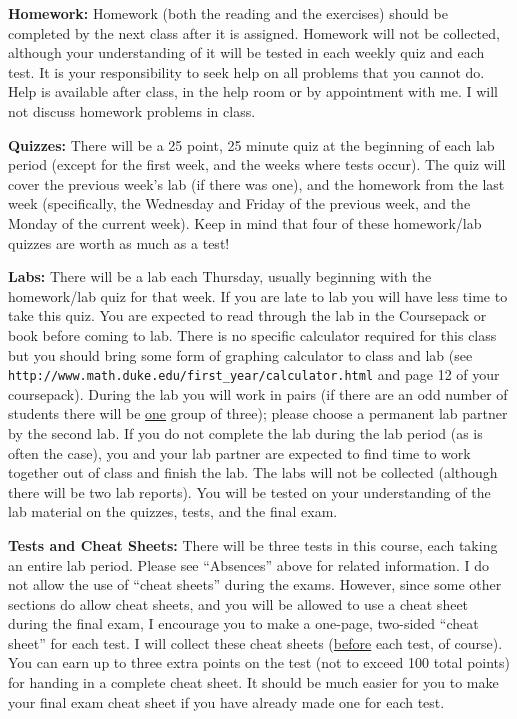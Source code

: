 \documentclass{article}
\begin{document}
{\bf Homework:} 
Homework (both the reading and the exercises) should be completed by the 
next class after it is assigned. Homework will not be collected, 
although your understanding of it will be tested in each weekly quiz 
and each test. It is your responsibility to seek help on all problems that 
you cannot do. Help is available after class, in the help room or 
by appointment with me. I will not discuss homework problems in class.

\clearpage

{\bf Quizzes:} 
There will be a 25 point, 25 minute quiz at the beginning of each lab 
period (except for the first week, and the weeks where tests occur).
The quiz will cover the previous week's lab (if there was one), and 
the homework from the last week (specifically, the Wednesday and 
Friday of the previous week, and the Monday of the current week).
Keep in mind that four of these homework/lab quizzes are worth as 
much as a test!
\vs

{\bf Labs:} 
There will be a lab each Thursday, usually beginning with the 
homework/lab quiz for that week. If you are late to lab you will have 
less time to take this quiz.  You are expected to read through 
the lab in the Coursepack or book before coming to lab.
There is no specific calculator required for this class but you should
bring some form of graphing calculator to class and lab 
(see \verb|http://www.math.duke.edu/first_year/calculator.html| and
page 12 of your coursepack).
During the lab you will work in pairs (if there are an odd number of 
students there will be \underline{one} group of three); please choose 
a permanent lab partner by the second lab.
If you do not complete the lab during the lab period (as is often the 
case), you and your lab partner are expected to find time to work 
together out of class and finish the lab.  The labs will not be 
collected (although there will be two lab reports).  You will be 
tested on your understanding of the lab material on the quizzes, 
tests, and the final exam.
\vs

{\bf Tests and Cheat Sheets:} 
There will be three tests in this course, each taking an entire lab 
period.  Please see ``Absences'' above for related information.
I do not allow the use of ``cheat sheets'' during 
the exams.  However, since some other sections do allow cheat sheets, 
and you will be allowed to use a cheat sheet during the final exam, I 
encourage you to make a one-page, two-sided ``cheat sheet'' for each 
test.  I will collect these cheat sheets (\underline{before} each 
test, of course).  You can earn up to three extra points on the test 
(not to exceed 100 total points) for handing in a complete cheat sheet.  
It should be much easier for you to make your 
final exam cheat sheet if you have already made one for each test.  
\vs
\end{document}
